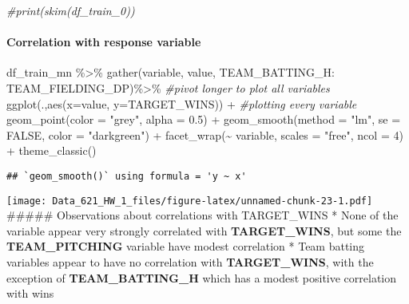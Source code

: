 \documentclass[
]{article}
\newenvironment{Shaded}{\begin{snugshade}}{\end{snugshade}}
\newcommand{\AttributeTok}[1]{\textcolor[rgb]{0.77,0.63,0.00}{#1}}
\newcommand{\CommentTok}[1]{\textcolor[rgb]{0.56,0.35,0.01}{\textit{#1}}}
\newcommand{\ConstantTok}[1]{\textcolor[rgb]{0.00,0.00,0.00}{#1}}
\newcommand{\DecValTok}[1]{\textcolor[rgb]{0.00,0.00,0.81}{#1}}
\newcommand{\FloatTok}[1]{\textcolor[rgb]{0.00,0.00,0.81}{#1}}
\newcommand{\FunctionTok}[1]{\textcolor[rgb]{0.00,0.00,0.00}{#1}}
\newcommand{\NormalTok}[1]{#1}
\newcommand{\SpecialCharTok}[1]{\textcolor[rgb]{0.00,0.00,0.00}{#1}}
\newcommand{\StringTok}[1]{\textcolor[rgb]{0.31,0.60,0.02}{#1}}
\begin{document}
\begin{Shaded}
\begin{Highlighting}[]
\CommentTok{\#print(skim(df\_train\_0))}
\end{Highlighting}
\end{Shaded}

\hypertarget{correlation-with-response-variable}{%
\paragraph{Correlation with response
variable}\label{correlation-with-response-variable}}

\begin{Shaded}
\begin{Highlighting}[]
\NormalTok{df\_train\_mn }\SpecialCharTok{\%\textgreater{}\%} 
  \FunctionTok{gather}\NormalTok{(variable, value, TEAM\_BATTING\_H}\SpecialCharTok{:}\NormalTok{ TEAM\_FIELDING\_DP)}\SpecialCharTok{\%\textgreater{}\%} \CommentTok{\#pivot longer to plot all variables}
  \FunctionTok{ggplot}\NormalTok{(.,}\FunctionTok{aes}\NormalTok{(}\AttributeTok{x=}\NormalTok{value, }\AttributeTok{y=}\NormalTok{TARGET\_WINS)) }\SpecialCharTok{+} \CommentTok{\#plotting every variable}
  \FunctionTok{geom\_point}\NormalTok{(}\AttributeTok{color =} \StringTok{"grey"}\NormalTok{, }\AttributeTok{alpha =} \FloatTok{0.5}\NormalTok{) }\SpecialCharTok{+}
  \FunctionTok{geom\_smooth}\NormalTok{(}\AttributeTok{method =} \StringTok{"lm"}\NormalTok{, }\AttributeTok{se =} \ConstantTok{FALSE}\NormalTok{, }\AttributeTok{color =} \StringTok{"darkgreen"}\NormalTok{) }\SpecialCharTok{+}
  \FunctionTok{facet\_wrap}\NormalTok{(}\SpecialCharTok{\textasciitilde{}}\NormalTok{ variable, }\AttributeTok{scales =} \StringTok{"free"}\NormalTok{, }\AttributeTok{ncol =} \DecValTok{4}\NormalTok{) }\SpecialCharTok{+}
  \FunctionTok{theme\_classic}\NormalTok{()}
\end{Highlighting}
\end{Shaded}

\begin{verbatim}
## `geom_smooth()` using formula = 'y ~ x'
\end{verbatim}

\texttt{[image: Data\_621\_HW\_1\_files/figure-latex/unnamed-chunk-23-1.pdf]}
\#\#\#\#\# Observations about correlations with TARGET\_WINS * None of
the variable appear very strongly correlated with \textbf{TARGET\_WINS},
but some the \textbf{TEAM\_PITCHING} variable have modest correlation *
Team batting variables appear to have no correlation with
\textbf{TARGET\_WINS}, with the exception of \textbf{TEAM\_BATTING\_H}
which has a modest positive correlation with wins
\end{document}
